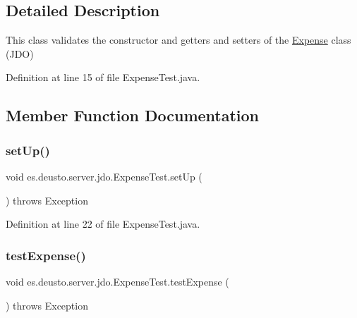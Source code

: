 \subsection{Detailed Description}
This class validates the constructor and getters and setters of the \hyperlink{classes_1_1deusto_1_1server_1_1jdo_1_1_expense}{Expense} class (J\+DO) 

Definition at line 15 of file Expense\+Test.\+java.



\subsection{Member Function Documentation}
\mbox{\label{classes_1_1deusto_1_1server_1_1jdo_1_1_expense_test_a6e23388add90f6a9465a6befc55978c2}} 
\subsubsection{\texorpdfstring{set\+Up()}{setUp()}}
{\footnotesize\ttfamily void es.\+deusto.\+server.\+jdo.\+Expense\+Test.\+set\+Up (\begin{DoxyParamCaption}{ }\end{DoxyParamCaption}) throws Exception}



Definition at line 22 of file Expense\+Test.\+java.

\mbox{\label{classes_1_1deusto_1_1server_1_1jdo_1_1_expense_test_a90db3b35017b6000665199694d7f715d}} 
\subsubsection{\texorpdfstring{test\+Expense()}{testExpense()}}
{\footnotesize\ttfamily void es.\+deusto.\+server.\+jdo.\+Expense\+Test.\+test\+Expense (\begin{DoxyParamCaption}{ }\end{DoxyParamCaption}) throws Exception}

